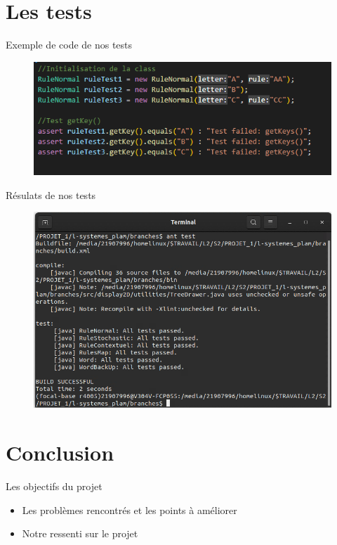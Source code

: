 \documentclass{beamer}
\begin{document}
\section{Les tests}
\begin{frame}
	\begin{block}{Exemple de code de nos tests}

	\begin{figure}[h]
	\includegraphics[scale=0.5]{images/testCode.png}
	\end{figure}

	\end{block}

\end{frame}

\begin{frame}
	\begin{block}{Résulats de nos tests}

	\begin{figure}[h]
	\includegraphics[scale=0.45]{images/ant_test.png}
	\end{figure}

	\end{block}

\end{frame}

\section{Conclusion}
\begin{frame}

\begin{block}{Les objectifs du projet}
	\begin{itemize}
		\item Les problèmes rencontrés et les points à améliorer
		\item Notre ressenti sur le projet
	\end{itemize}
\end{block}

\end{frame}
\end{document}

